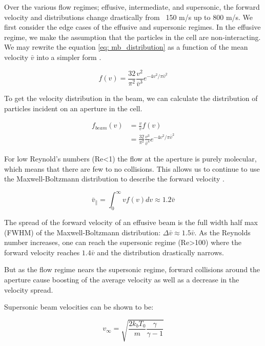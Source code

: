 Over the various flow regimes; effusive, intermediate, and supersonic, the forward velocity and distributions change drastically from ~150 m/s up to 800 m/s. We first consider the edge cases of the effusive and supersonic regimes. In the effusive regime, we make the assumption that the particles in the cell are non-interacting. We may rewrite the equation \ref{eq: mb_distribution} as a function of the mean velocity $\bar{v}$ into a simpler form .

\begin{equation}
	f(v) = \frac{32}{\pi^2} \frac{v^2}{\bar{v}^3} e^{-4v^2/\pi \bar{v}^2} \label{eq: mb_simplified}
\end{equation}

To get the velocity distribution in the beam, we can calculate the distribution of particles incident on an aperture in the cell.

\begin{align*}
	f_{beam}(v) & = \frac{v}{\bar{v}}f(v)  \\
	& = \frac{32}{\pi^2} \frac{v^3}{\bar{v}^4} e^{-4v^2/\pi \bar{v}^2}
\end{align*}

For low Reynold's numbers (Re<1) the flow at the aperture is purely molecular, which means that there are few to no collisions. This allows us to continue to use the Maxwell-Boltzmann distribution to describe the forward velocity \cite{Hutzler2011c}.

\begin{equation}
	\bar{v}_\parallel = \int_0^\infty v f(v) dv \approx 1.2 \bar{v}
\end{equation}

The spread of the forward velocity of an effusive beam is the full width half max (FWHM) of the Maxwell-Boltzmann distribution: $\Delta\bar{v} \approx 1.5 \bar{v}$. As the Reynolds number increases, one can reach the supersonic regime (Re>100) where the forward velocity reaches $1.4\bar{v}$ and the distribution drastically narrows.\cite{Hutzler2011c,Pauly}

But as the flow regime nears the supersonic regime, forward collisions around the aperture cause boosting of the average velocity as well as a decrease in the velocity spread.

Supersonic beam velocities can be shown to be:\cite{Pauly}

\begin{equation*}
	v_\infty = \sqrt{\frac{2 k_b T_0}{m}\frac{\gamma}{\gamma - 1}}
\end{equation*}

